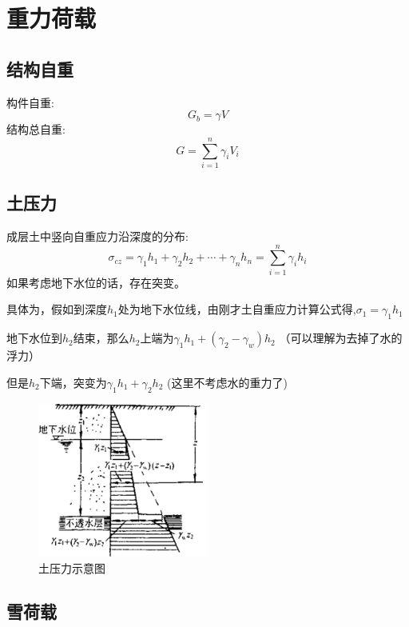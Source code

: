 \documentclass[12pt, a4paper, oneside, UTF8]{ctexbook}
\begin{document}
\else
\fi

\chapter{重力荷载}

\section{结构自重}

\begin{definition}
    构件自重:
\[ G_b = \gamma V \]
结构总自重:
\[ G = \sum_{i=1}^{n} \gamma_i V_i \]
\end{definition}

\section{土压力}

\begin{definition}
    成层土中竖向自重应力沿深度的分布:
$$
\sigma_{cz} = \gamma_1 h_1 + \gamma_2 h_2 + \cdots + \gamma_n h_n = \sum_{i=1}^{n} \gamma_i h_i
$$
如果考虑地下水位的话，存在突变。

具体为，假如到深度$h_1$处为地下水位线，由刚才土自重应力计算公式得,$\sigma_1=\gamma_1 h_1$

地下水位到$h_2$结束，那么$h_2$上端为$\gamma_1 h_1 + (\gamma_2 -\gamma_w )h_2$ （可以理解为去掉了水的浮力）

但是$h_2$下端，突变为$\gamma_1 h_1 + \gamma_2 h_2$ (这里不考虑水的重力了)
\end{definition}

\begin{figure}[H]
    \centering
    \includegraphics[width=0.5\textwidth]{../figure/tuyali}
    \caption{土压力示意图}
    \label{fig:tuyali}
\end{figure}

\section{雪荷载}
\end{document}
